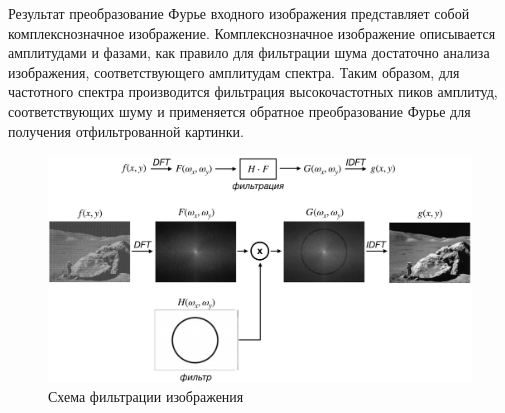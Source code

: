 Результат преобразование Фурье входного изображения представляет собой комплекснозначное изображение. Комплекснозначное изображение описывается амплитудами и фазами, как правило для фильтрации шума достаточно анализа изображения, соответствующего амплитудам спектра.
Таким образом, для частотного спектра производится фильтрация высокочастотных пиков амплитуд, соответствующих шуму и применяется обратное преобразование Фурье для получения отфильтрованной картинки.
\begin{figure}[!htb]
\centering
\includegraphics[width=16cm]{chapters/grigorev_s1/pictures/image_filtartion_with_scheme}%
\caption{Схема фильтрации изображения}
\end{figure}

